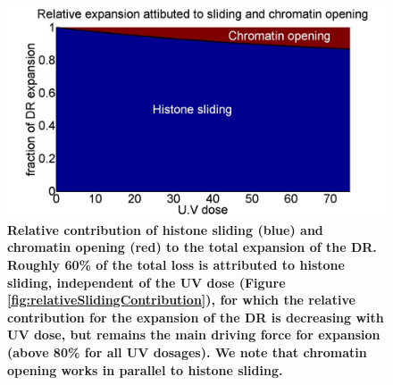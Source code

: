 \documentclass[12pt]{article}
\begin{document}
\begin{figure}[H]
\centering
\includegraphics[width=0.5\linewidth, height=0.3\textheight]{histoneAndDNARelativeExpansionContribution}
\caption{\textbf{Relative contribution of histone sliding (blue) and chromatin opening (red) to the total expansion of the DR. Roughly 60\% of the total loss is attributed to histone sliding, independent of the UV dose (Figure \ref{fig:relativeSlidingContribution}), for which the relative contribution for the expansion of the DR is decreasing with UV dose, but remains the main driving force for expansion (above 80\% for all UV dosages). We note that chromatin opening works in parallel to histone sliding. }}
\label{fig:histoneAndDNARelativeExpansionContribution}
\end{figure}
\end{document}
